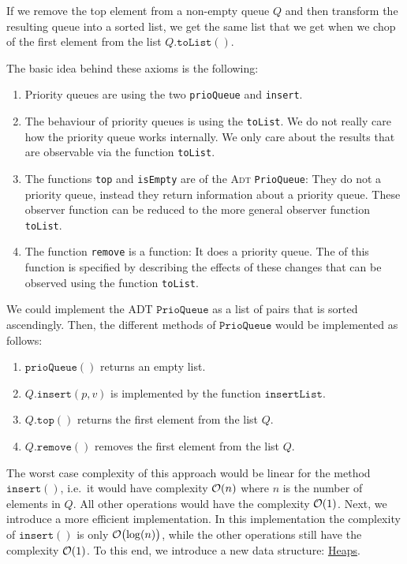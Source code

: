\begin{Definition}
\begin{enumerate}
\begin{enumerate}
            If we remove the top element from a non-empty queue $Q$ and then transform the resulting queue into
            a sorted list, we get the same list that we get when we chop of the first element from the list
            $Q.\texttt{toList}()$.
      \end{enumerate}
      The basic idea behind these axioms is the following:  
      \begin{enumerate}
      \item Priority queues are  using the two  \texttt{prioQueue} and
            \texttt{insert}.
      \item The behaviour of priority queues is  using the 
            \texttt{toList}.  We do not really care how the priority queue works internally.  We only care
            about the results that are observable via the function \texttt{toList}.  
      \item The functions \texttt{top} and \texttt{isEmpty} are  of the \textsc{Adt}
            \texttt{PrioQueue}:  They do not  a priority queue, instead they return information
            about a priority queue.  These observer function can be reduced to the more general observer
            function \texttt{toList}. 
      \item The function \texttt{remove} is a  function: It does  a priority queue.
            The  of this function is specified by describing the effects of these
            changes that can be observed using the function \texttt{toList}. 
      \end{enumerate}
\end{enumerate}
\end{Definition}
We could implement the ADT $\texttt{PrioQueue}$ as a list of pairs that is sorted ascendingly.
Then, the different methods of $\texttt{PrioQueue}$ would be implemented as follows:
\begin{enumerate}
\item $\texttt{prioQueue}()$ returns an empty list.
\item $Q.\texttt{insert}(p,v)$ is implemented by the function $\texttt{insertList}$. 
\item $Q.\texttt{top}()$ returns the first element from the list $Q$.
\item $Q.\texttt{remove}()$ removes the first element from the list $Q$.
\end{enumerate}
The worst case complexity of this approach would be linear for the method $\texttt{insert}()$,
i.e.~it would have complexity $\mathcal{O}(n)$ where $n$ is the number of elements in $Q$. 
All other operations would have the complexity $\mathcal{O}(1)$.  
Next, we introduce a more efficient implementation.  In this implementation the complexity of $\texttt{insert}()$ 
is only $\mathcal{O}\bigl(\log(n)\bigr)$, while the other operations still have the complexity $\mathcal{O}(1)$.
To this end, we introduce a new data structure: \href{https://en.wikipedia.org/wiki/Heap_(data_structure)}{Heaps}. 

